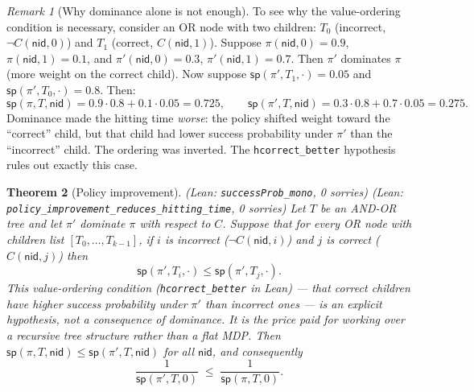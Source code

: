\documentclass[reqno,11pt]{amsart}
\newcommand{\sP}{\mathsf{sp}}
\newcommand{\nid}{\mathsf{nid}}
\newcommand{\leanverified}[1]{\textup{(Lean: \texttt{\small #1}, 0 sorries)}}
\theoremstyle{plain}
\newtheorem{theorem}{Theorem}[section]
\theoremstyle{definition}
\theoremstyle{remark}
\newtheorem{remark}[theorem]{Remark}
\begin{document}
\begin{remark}[Why dominance alone is not enough]
To see why the value-ordering condition is necessary, consider an OR node with two children: $T_0$ (incorrect, $\neg C(\nid,0)$) and $T_1$ (correct, $C(\nid,1)$). Suppose $\pi(\nid,0) = 0.9$, $\pi(\nid,1) = 0.1$, and $\pi'(\nid,0) = 0.3$, $\pi'(\nid,1) = 0.7$. Then $\pi'$ dominates $\pi$ (more weight on the correct child). Now suppose $\sP(\pi', T_1, \cdot) = 0.05$ and $\sP(\pi', T_0, \cdot) = 0.8$. Then:
\[
\sP(\pi, T, \nid) = 0.9 \cdot 0.8 + 0.1 \cdot 0.05 = 0.725, \qquad
\sP(\pi', T, \nid) = 0.3 \cdot 0.8 + 0.7 \cdot 0.05 = 0.275.
\]
Dominance made the hitting time \emph{worse}: the policy shifted weight toward the ``correct'' child, but that child had lower success probability under $\pi'$ than the ``incorrect'' child. The ordering was inverted. The \texttt{hcorrect\_better} hypothesis rules out exactly this case.
\end{remark}

\begin{theorem}[Policy improvement]\label{thm:policy}
\leanverified{successProb\_mono} \leanverified{policy\_improvement\_reduces\_hitting\_time}
Let $T$ be an AND-OR tree and let $\pi'$ dominate $\pi$ with respect to $C$. Suppose that for every OR node with children list $[T_0,\ldots,T_{k-1}]$, if $i$ is incorrect ($\neg C(\nid,i)$) and $j$ is correct ($C(\nid,j)$) then
\[
\sP(\pi', T_i, \cdot) \le \sP(\pi', T_j, \cdot).
\]
This \emph{value-ordering condition} (\texttt{hcorrect\_better} in Lean) --- that correct children have higher success probability under $\pi'$ than incorrect ones --- is an explicit hypothesis, not a consequence of dominance. It is the price paid for working over a recursive tree structure rather than a flat MDP. Then $\sP(\pi, T, \nid) \le \sP(\pi', T, \nid)$ for all $\nid$, and consequently
\[
\frac{1}{\sP(\pi', T, 0)} \;\le\; \frac{1}{\sP(\pi, T, 0)}.
\]
\end{theorem}
\end{document}
